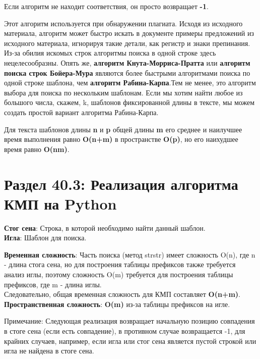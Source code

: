
Если алгоритм не находит соответствия, он просто возвращает \textbf{-1}.

\vspace{\baselineskip}

Этот алгоритм используется при обнаружении плагиата. Исходя из исходного материала, алгоритм может быстро искать в документе примеры предложений из исходного материала, игнорируя такие детали, как регистр и знаки препинания. Из-за обилия искомых строк алгоритмы поиска в одной строке здесь нецелесообразны. Опять же, \textbf{алгоритм Кнута-Морриса-Пратта} или \textbf{алгоритм поиска строк Бойера-Мура} являются более быстрыми алгоритмами поиска по одной строке шаблона, чем \textbf{алгоритм Рабина-Карпа}.Тем не менее, это алгоритм выбора для поиска по нескольким шаблонам. Если мы хотим найти любое из большого числа, скажем, k, шаблонов фиксированной длины в тексте, мы можем создать простой вариант алгоритма Рабина-Карпа.

\vspace{\baselineskip}

Для текста шаблонов длины \textbf{n} и \textbf{p} общей длины \textbf{m} его среднее и наилучшее время выполнения равно \textbf{O(n+m)} в пространстве \textbf{O(p)}, но его наихудшее время равно \textbf{O(nm)}.

\section*{Раздел 40.3: Реализация алгоритма КМП на Python}

\textbf{Стог сена}: Строка, в которой необходимо найти данный шаблон. \\
\textbf{Игла}: Шаблон для поиска.

\vspace{\baselineskip}

\textbf{Временная сложность}: Часть поиска (метод strstr) имеет сложность O(n), где n - длина стога сена, но для построения таблицы префиксов также требуется анализ иглы, поэтому сложность O(m) требуется для построения таблицы префиксов, где m - длина иглы. \\
Следовательно, общая временная сложность для КМП составляет \textbf{O(n+m)}. \\
\textbf{Пространственная сложность}: \textbf{O(m)} из-за таблицы префиксов на игле.

\vspace{\baselineskip}

Примечание: Следующая реализация возвращает начальную позицию совпадения в стоге сена (если есть совпадение), в противном случае возвращается -1, для крайних случаев, например, если игла или стог сена является пустой строкой или игла не найдена в стоге сена.


